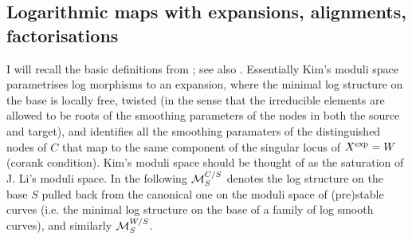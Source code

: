 \subsection{Logarithmic maps with expansions, alignments, factorisations} I will recall the basic definitions from \cite{KimLog,ChenDeg}; see also \cite{OlsCurves,AbramovichMarcusWiseComparison}. Essentially Kim's moduli space parametrises log morphisms to an expansion, where the minimal log structure on the base is locally free, twisted (in the sense that the irreducible elements are allowed to be roots of the smoothing parameters of the nodes in both the source and target), and identifies all the smoothing paramaters of the distinguished nodes of $C$ that map to the same component of the singular locus of $X^{\rm{exp}}=W$ (corank condition). Kim's moduli space should be thought of as the saturation of J. Li's moduli space. In the following $\mathcal M_S^{C/S}$ denotes the log structure on the base $S$ pulled back from the canonical one on the moduli space of (pre)stable curves (i.e. the minimal log structure on the base of a family of log smooth curves), and similarly $\mathcal M_S^{W/S}$.

